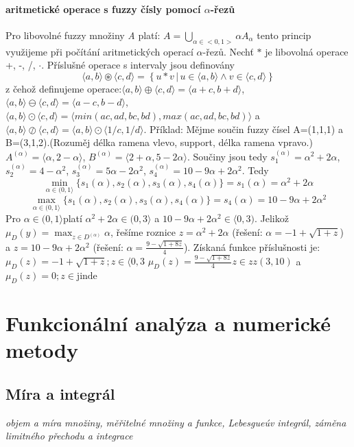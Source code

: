 \documentclass[a4]{report}
\theoremstyle{definition}
\begin{document}
{\subsubsection{aritmetické operace s fuzzy čísly pomocí $\alpha$-řezů}
Pro libovolné fuzzy množiny \textit{A} platí: $A=\bigcup\limits_{\alpha \in <0,1>} \alpha A_{\alpha}$
tento princip využijeme při počítání aritmetických operací $\alpha$-řezů. 
Nechť $\ast$ je libovolná operace +, -, /, $\cdot$. Příslušné operace s intervaly jsou definovány $$\langle a,b \rangle \circledast \langle c,d\rangle= \left \{ u\ast v\,|\, u \in \langle a,b\rangle \wedge v \in \langle c,d\rangle \right \}$$ z čehož definujeme operace:$\langle a,b \rangle \oplus \langle c,d\rangle = \langle a+c,b+d\rangle $, $\langle a,b \rangle \ominus \langle c,d\rangle = \langle a-c,b-d\rangle $, $\langle a,b \rangle \odot \langle c,d\rangle = \langle min(ac, ad, bc, bd),max(ac, ad, bc, bd)\rangle $ a $\langle a,b \rangle \oslash \langle c,d\rangle = \langle a,b \rangle \odot \langle 1/c,1/d\rangle $.
Příklad: Mějme součin fuzzy čísel A=(1,1,1) a B=(3,1,2).(Rozuměj délka ramena vlevo, support, délka ramena vpravo.)
$A^{(\alpha)}=\langle \alpha, 2-\alpha \rangle$, $B^{(\alpha)}=\langle 2 + \alpha, 5-2\alpha \rangle$. Součiny jsou tedy $s_1^{(\alpha)}=\alpha^2 +2\alpha$, $s_2^{(\alpha)}=4-\alpha^2$, $s_3^{(\alpha)}=5\alpha-2\alpha^2$, $s_4^{(\alpha)}=10-9\alpha+2\alpha^2$. Tedy $$\min_{\alpha \in (0,1 \rangle} \{ s_1 (\alpha), s_2 (\alpha), s_3 (\alpha), s_4 (\alpha) \}=s_1 (\alpha)=\alpha^2 +2\alpha$$
$$\max_{\alpha \in (0,1 \rangle} \{ s_1 (\alpha), s_2 (\alpha), s_3 (\alpha), s_4 (\alpha) \}=s_4 (\alpha)=10-9\alpha+2\alpha^2$$ Pro $\alpha \in (0,1 \rangle$platí $\alpha^2 +2\alpha \in (0,3 \rangle$ a $10-9\alpha+2\alpha^2 \in \langle 0,3)$. Jelikož $\mu_D (y)=\max_{z \in D^{(\alpha)}} \alpha$, řešíme roznice $z=\alpha^2 +2\alpha$ (řešení: $\alpha = -1 + \sqrt{1+z}$) a $z=10-9\alpha+2\alpha^2$ (řešení: $\alpha=\frac{9-\sqrt{1+8z}}{4}$).
Získaná funkce příslušnosti je:
$\mu_D (z)= -1 + \sqrt{1+z}; z \in \langle 0,3$ $\mu_D (z)=  \frac{9-\sqrt{1+8z}}{4} z \in zz(3,10)$ a $\mu_D (z)=0;z \in \text{jinde}$

\chapter{Funkcionální analýza a numerické metody}
\section{Míra a integrál}
\textit{objem a míra množiny, měřitelné množiny a funkce, Lebesgueúv integrál, záměna limitného přechodu a integrace}
}
\end{document}
